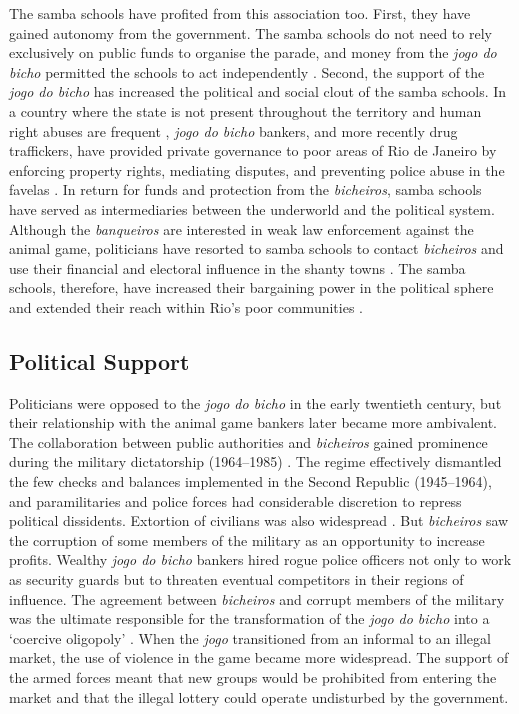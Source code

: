 \documentclass[a4paper,12pt]{article}
\begin{document}
The samba schools have profited from this association too. First, they have gained autonomy from the government. The samba schools do not need to rely exclusively on public funds to organise the parade, and money from the \emph{jogo do bicho} permitted the schools to act independently \citep[209]{chinelli1993vazio}. Second, the support of the \emph{jogo do bicho} has increased the political and social clout of the samba schools. In a country where the state is not present throughout the territory and human right abuses are frequent \citep{odonnell1993state,pinheiro2000}, \emph{jogo do bicho} bankers, and more recently drug traffickers, have provided private governance to poor areas of Rio de Janeiro by enforcing property rights, mediating disputes, and preventing police abuse in the favelas \citep{arias2006dynamics,goldstein2013laughter}. In return for funds and protection from the \emph{bicheiros}, samba schools have served as intermediaries between the underworld and the political system. Although the \emph{banqueiros} are interested in weak law enforcement against the animal game, politicians have resorted to samba schools to contact \emph{bicheiros} and use their financial and electoral influence in the shanty towns \citep[17]{misse2011crime}. The samba schools, therefore, have increased their bargaining power in the political sphere and extended their reach within Rio's poor communities \citep[215]{chinelli1993vazio}.

\subsection{Political Support}
\label{sub:support}

Politicians were opposed to the \emph{jogo do bicho} in the early twentieth century, but their relationship with the animal game bankers later became more ambivalent. The collaboration between public authorities and \emph{bicheiros} gained prominence during the military dictatorship (1964--1985) \citep{gaspari2002ditadura,jupiara2015poroes}. The regime effectively dismantled the few checks and balances implemented in the Second Republic (1945--1964), and paramilitaries and police forces had considerable discretion to repress political dissidents. Extortion of civilians was also widespread \citep{magalhaes1997logica,misse2009acumulaccao}. But \emph{bicheiros} saw the corruption of some members of the military as an opportunity to increase profits. Wealthy \emph{jogo do bicho} bankers hired rogue police officers not only to work as security guards but to threaten eventual competitors in their regions of influence. The agreement between \emph{bicheiros} and corrupt members of the military was the ultimate responsible for the transformation of the \emph{jogo do bicho} into a `coercive oligopoly' \citep{jupiara2015poroes}. When the \textit{jogo} transitioned from an informal to an illegal market, the use of violence in the game became more widespread. The support of the armed forces meant that new groups would be prohibited from entering the market and that the illegal lottery could operate undisturbed by the government.
\end{document}
